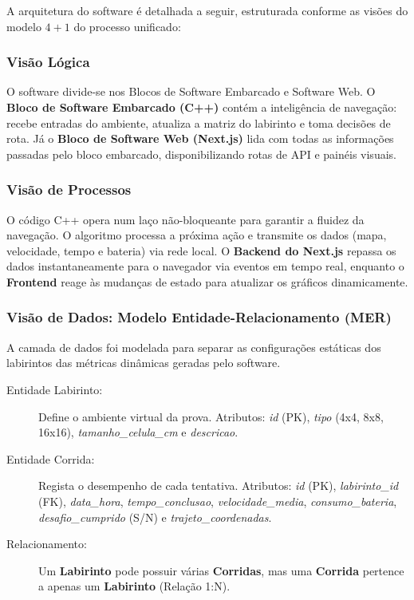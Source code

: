 A arquitetura do software é detalhada a seguir, estruturada conforme as visões do modelo $4+1$ do processo unificado:

\subsubsection{Visão Lógica}
O software divide-se nos Blocos de Software Embarcado e Software Web. O \textbf{Bloco de Software Embarcado (C++)} contém a inteligência de navegação: recebe entradas do ambiente, atualiza a matriz do labirinto e toma decisões de rota. Já o \textbf{Bloco de Software Web (Next.js)} lida com todas as informações passadas pelo bloco embarcado, disponibilizando rotas de API e painéis visuais.

\subsubsection{Visão de Processos}
O código C++ opera num laço não-bloqueante para garantir a fluidez da navegação. O algoritmo processa a próxima ação e transmite os dados (mapa, velocidade, tempo e bateria) via rede local. O \textbf{Backend do Next.js} repassa os dados instantaneamente para o navegador via eventos em tempo real, enquanto o \textbf{Frontend} reage às mudanças de estado para atualizar os gráficos dinamicamente.

\subsubsection{Visão de Dados: Modelo Entidade-Relacionamento (MER)}
A camada de dados foi modelada para separar as configurações estáticas dos labirintos das métricas dinâmicas geradas pelo software. 

\begin{description}
    \item[Entidade Labirinto:] Define o ambiente virtual da prova. Atributos: \textit{id} (PK), \textit{tipo} (4x4, 8x8, 16x16), \textit{tamanho\_celula\_cm} e \textit{descricao}.
    \item[Entidade Corrida:] Regista o desempenho de cada tentativa. Atributos: \textit{id} (PK), \textit{labirinto\_id} (FK), \textit{data\_hora}, \textit{tempo\_conclusao}, \textit{velocidade\_media}, \textit{consumo\_bateria}, \textit{desafio\_cumprido} (S/N) e \textit{trajeto\_coordenadas}.
    \item[Relacionamento:] Um \textbf{Labirinto} pode possuir várias \textbf{Corridas}, mas uma \textbf{Corrida} pertence a apenas um \textbf{Labirinto} (Relação 1:N).
\end{description}

